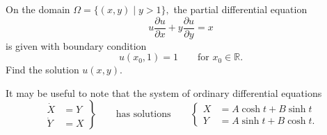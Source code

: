 On the domain
\(
\Omega = \{(x,y) \mid y>1\},
\)
the partial differential equation
\begin{equation}
u
\frac{\partial u}{\partial x}
+
y
\frac{\partial u}{\partial y}
=
x
\label{30000027:pde}
\end{equation}
is given with boundary condition
\[
u(x_0,1) = 1 \qquad\text{for $x_0\in\mathbb{R}$}.
\]
Find the solution $u(x,y)$.

\begin{hinweis}
It may be useful to note that the system of ordinary differential
equations
\[
\left.
\begin{aligned}
\dot{X} &= Y\\
\dot{Y} &= X
\end{aligned}
\right\}
\qquad\text{has solutions}\qquad
\left\{
\begin{aligned}
X &= A\cosh t + B\sinh t\\
Y &= A\sinh t + B\cosh t.
\end{aligned}
\right.
\]
\end{hinweis}

